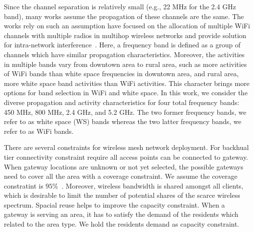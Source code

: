 Since the channel separation is relatively small (e.g., 22 MHz for 
the 2.4 GHz band), many works assume the propagation of these channels are the same.
The works rely on such an assumption have focused on the 
allocation of multiple WiFi channels with multiple radios in 
multihop wireless networks and provide solution for intra-network interference~\cite{si2010overview}. 
Here, a frequency band is defined as a group of channels which have
similar propagation characteristics.
Moreover, the activities in multiple bands vary from downtown area 
to rural area, such as more activities of WiFi bands 
than white space frequencies in downtown area, and rural area, 
more white space band activities than WiFi activities. 
This character brings more options for band selection in WiFi and white space.
In this work, we consider the diverse propagation and activity characteristics
for four total frequency bands: 450 MHz, 800 MHz, 2.4 GHz, and 5.2 GHz.
The two former frequency bands, we refer to as white space (WS) bands whereas
the two latter frequency bands, we refer to as WiFi bands.


There are several constraints for wireless mesh network deployment. For backhual tier 
connectivity constraint require all access points can be connected to gateway.
When gateway locations are unknown or not yet selected, the possible gateways need
to cover all the area with a coverage constraint. We assume the coverage
constratint is $95\%$~\cite{robinson2010deploying}. 
Moreover, wireless bandwidth is shared amongst all clients, which is desirable to 
limit the number of potential shares of the scarce wireless spectrum. Spacial reuse 
helps to improve the capacity constraint. When a gateway is serving an area, it has
to satisfy the demand of the residents which related to the area type. We hold the 
residents demand as capacity constraint.

